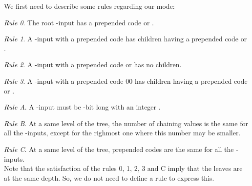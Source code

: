 \documentclass{llncs}
\renewcommand{\paragraph}[1]{\noindent\textit{#1}.}
\begin{document}
\noindent
We first need to describe some rules regarding our mode:

\paragraph{Rule 0} The root -input has a prepended code  or . 

\paragraph{Rule 1} A -input with a prepended code  has children having a prepended code  or . 

\paragraph{Rule 2} A -input with a prepended code  or  has no children.

\paragraph{Rule 3} A -input with a prepended code 00 has children having a prepended code  or .

\paragraph{Rule A} A -input must be -bit long with an integer .

\paragraph{Rule B} At a same level of the tree, the number of chaining values is the same for all the -inputs, except for the righmost one where 
 this number may be smaller.
 
\paragraph{Rule C} At a same level of the tree, prepended codes are the same for all the -inputs.~\\

\noindent
Note that the satisfaction of the rules 0, 1, 2, 3 and C imply that the leaves are at the same depth. So, we do not need to define a rule to express this.~\\
\end{document}
